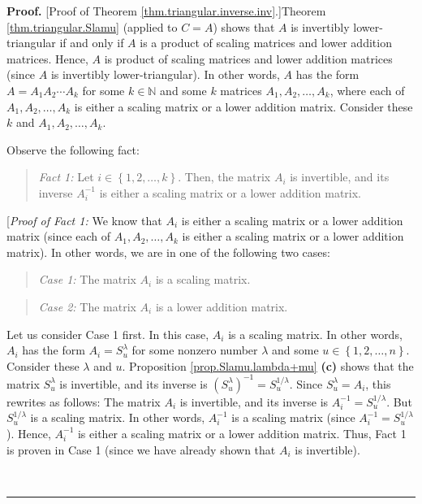 \documentclass[numbers=enddot,12pt,final,onecolumn,notitlepage]{scrartcl}%
\theoremstyle{definition}
\newenvironment{statement}{\begin{quote}}{\end{quote}}
\newenvironment{proof}[1][Proof]{\noindent\textbf{#1.} }{\ \rule{0.5em}{0.5em}}
\begin{document}
\begin{proof}
[Proof of Theorem \ref{thm.triangular.inverse.inv}.]Theorem
\ref{thm.triangular.Slamu} (applied to $C=A$) shows that $A$ is invertibly
lower-triangular if and only if $A$ is a product of scaling matrices and lower
addition matrices. Hence, $A$ is product of scaling matrices and lower
addition matrices (since $A$ is invertibly lower-triangular). In other words,
$A$ has the form $A=A_{1}A_{2}\cdots A_{k}$ for some $k\in\mathbb{N}$ and some
$k$ matrices $A_{1},A_{2},\ldots,A_{k}$, where each of $A_{1},A_{2}%
,\ldots,A_{k}$ is either a scaling matrix or a lower addition matrix. Consider
these $k$ and $A_{1},A_{2},\ldots,A_{k}$.

Observe the following fact:

\begin{statement}
\textit{Fact 1:} Let $i\in\left\{  1,2,\ldots,k\right\}  $. Then, the matrix
$A_{i}$ is invertible, and its inverse $A_{i}^{-1}$ is either a scaling matrix
or a lower addition matrix.
\end{statement}

[\textit{Proof of Fact 1:} We know that $A_{i}$ is either a scaling matrix or
a lower addition matrix (since each of $A_{1},A_{2},\ldots,A_{k}$ is either a
scaling matrix or a lower addition matrix). In other words, we are in one of
the following two cases:

\begin{statement}
\textit{Case 1:} The matrix $A_{i}$ is a scaling matrix.
\end{statement}

\begin{statement}
\textit{Case 2:} The matrix $A_{i}$ is a lower addition matrix.
\end{statement}

Let us consider Case 1 first. In this case, $A_{i}$ is a scaling matrix. In
other words, $A_{i}$ has the form $A_{i}=S_{u}^{\lambda}$ for some nonzero
number $\lambda$ and some $u\in\left\{  1,2,\ldots,n\right\}  $. Consider
these $\lambda$ and $u$. Proposition \ref{prop.Slamu.lambda+mu} \textbf{(c)}
shows that the matrix $S_{u}^{\lambda}$ is invertible, and its inverse is
$\left(  S_{u}^{\lambda}\right)  ^{-1}=S_{u}^{1/\lambda}$. Since
$S_{u}^{\lambda}=A_{i}$, this rewrites as follows: The matrix $A_{i}$ is
invertible, and its inverse is $A_{i}^{-1}=S_{u}^{1/\lambda}$. But
$S_{u}^{1/\lambda}$ is a scaling matrix. In other words, $A_{i}^{-1}$ is a
scaling matrix (since $A_{i}^{-1}=S_{u}^{1/\lambda}$). Hence, $A_{i}^{-1}$ is
either a scaling matrix or a lower addition matrix. Thus, Fact 1 is proven in
Case 1 (since we have already shown that $A_{i}$ is invertible).


\end{proof}
\end{document}
